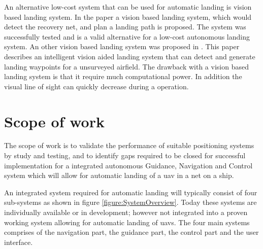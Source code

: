 An alternative low-cost system that can be used for automatic landing is vision based landing system. In the paper \citep{kim2013fully} a vision based landing system, which would detect the recovery net, and plan a landing path is proposed. The system was successfully tested and is a valid alternative for a low-cost autonomous landing system. An other vision based landing system was proposed in \citep{williams2012intelligent}. This paper describes an intelligent vision aided landing system that can detect and generate landing waypoints for a unsurveyed airfield. The drawback with a vision based landing system is that it require much computational power. In addition the visual line of sight can quickly decrease during a operation.
\section{Scope of work}
The scope of work is to validate the performance of suitable positioning systems by study and testing, and to identify gaps required to be closed for successful implementation for a integrated autonomous Guidance, Navigation and Control system which will allow for automatic landing of a \gls{uav} in a net on a ship.

An integrated system required for automatic landing will typically consist of four sub-systems as shown in figure \ref{figure:SystemOverview}. Today these systems are individually available or in development; however not integrated into a proven working system allowing for automatic landing of \glspl{uav}. The four main systems comprises of the navigation part, the guidance part, the control part and the user interface.

